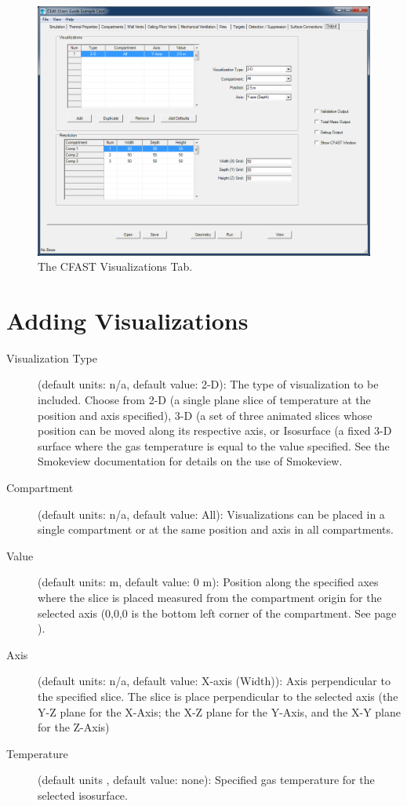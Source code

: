\begin{figure}[h!]
\begin{center}
\includegraphics[width=6.5in]{FIGURES/Visualizations_Tab}
\caption[The CFAST Visualizations Tab]{The CFAST Visualizations Tab.}
\end{center}
\end{figure}

\section{Adding Visualizations}

\begin{description}
\item[Visualization Type] (default units: n/a, default value: 2-D): The type of visualization to be included. Choose from 2-D (a single plane slice of temperature at the position and axis specified), 3-D (a set of three animated slices whose position can be moved along its respective axis, or Isosurface (a fixed 3-D surface where the gas temperature is equal to the value specified. See the Smokeview documentation \cite{Smokeview_Users_Guide_6} for details on the use of Smokeview.

\item[Compartment] (default units: n/a, default value: All): Visualizations can be placed in a single compartment or at the same position and axis in all compartments.

\item[Value] (default units: m, default value: 0 m): Position along the specified axes where the slice is placed measured from the compartment origin for the selected axis (0,0,0 is the bottom left corner of the compartment. See page \pageref{Compartment_Geometry}).

\item[Axis] (default units: n/a, default value: X-axis (Width)): Axis perpendicular to the specified slice.  The slice is place perpendicular to the selected axis (the Y-Z plane for the X-Axis; the X-Z plane for the Y-Axis, and the X-Y plane for the Z-Axis)

\item[Temperature] (default units \degc, default value: none): Specified gas temperature for the selected isosurface.
\end{description}

